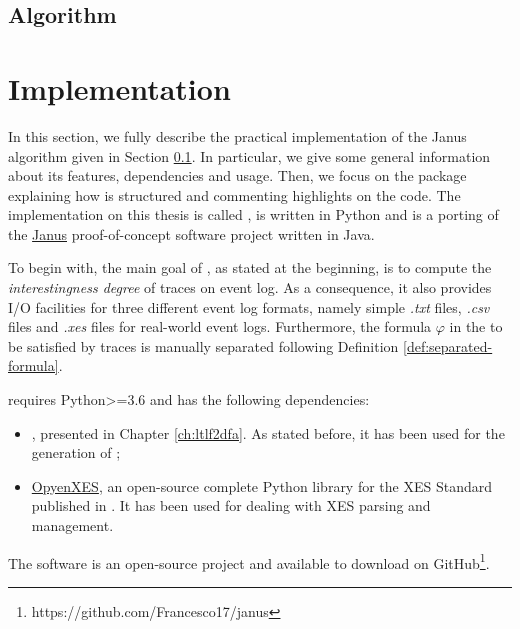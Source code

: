 \subsection{Algorithm}\label{sec:janus-alg}
\section{Implementation}\label{sec:janus-implementation}
In this section, we fully describe the practical implementation of the Janus algorithm given in Section \ref{sec:janus-alg}. In particular, we give some general information about its features, dependencies and usage. Then, we focus on the package explaining how is structured and commenting highlights on the code. The implementation on this thesis is called \janus, is written in Python and is a porting of the \href{https://github.com/Oneiroe/Janus}{Janus} proof-of-concept software project written in Java.

To begin with, the main goal of \janus, as stated at the beginning, is to compute the \textit{interestingness degree} of traces on event log.  As a consequence, it also provides I/O facilities for three different event log formats, namely simple \textit{.txt} files, \textit{.csv} files and \textit{.xes} files for real-world event logs. Furthermore, the formula $\varphi$ in the \rcon\xspace to be satisfied by traces is manually separated following Definition \ref{def:separated-formula}.

\janus requires Python>=3.6 and has the following dependencies:
\begin{itemize}
\item \LTLfToDFA, presented in Chapter \ref{ch:ltlf2dfa}. As stated before, it has been used for the generation of \DFAs;
\item \href{https://github.com/opyenxes/OpyenXes}{OpyenXES}, an open-source complete Python library for the XES Standard published in \citep{DBLP:conf/bpm/ValdiviesoLMS18}. It has been used for dealing with XES parsing and management.
\end{itemize} 
The \janus software is an open-source project and available to download on GitHub\footnote{https://github.com/Francesco17/janus}.
